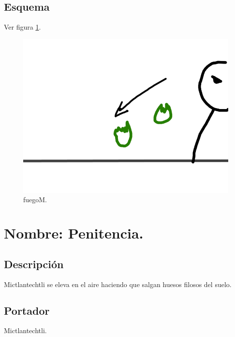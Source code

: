 \subsection{Esquema}	
			Ver figura \ref{fig:fuegoM}.
			\begin{figure}
				\centering
				\includegraphics[height=0.2 \textheight]{Imagenes/fuegoM}
				\caption{fuegoM.}
				\label{fig:fuegoM}
			\end{figure}
\section{Nombre: Penitencia.}\label{hab.Penitencia}
\subsection{Descripción}
Mictlantechtli se eleva en el aire haciendo que salgan huesos filosos del suelo.
\subsection{Portador}
Mictlantechtli.
